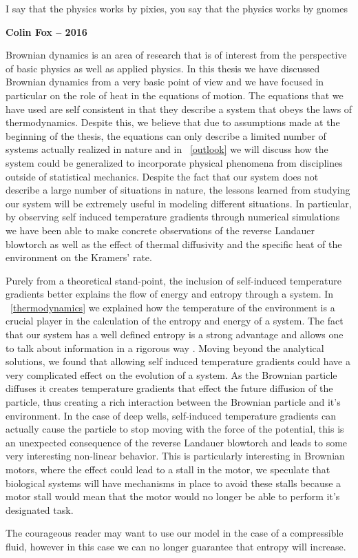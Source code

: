 \epigraph{I say that the physics works by pixies, you say that the physics works by gnomes}{\textbf{Colin Fox -- 2016}}

Brownian dynamics is an area of research that is of interest from the perspective of basic physics as well as applied physics. In this thesis we have discussed Brownian dynamics from a very basic point of view and we have focused in particular on the role of heat in the equations of motion. The equations that we have used are self consistent in that they describe a system that obeys the laws of thermodynamics. Despite this, we believe that due to assumptions made at the beginning of the thesis, the equations can only describe a limited number of systems actually realized in nature and in ~\autoref{outlook} we will discuss how the system could be generalized to incorporate physical phenomena from disciplines outside of statistical mechanics. Despite the fact that our system does not describe a large number of situations in nature, the lessons learned from studying our system will be extremely useful in modeling different situations. In particular, by observing self induced temperature gradients through numerical simulations we have been able to make concrete observations of the reverse Landauer blowtorch as well as the effect of thermal diffusivity and the specific heat of the environment on the Kramers' rate.  

Purely from a theoretical stand-point, the inclusion of self-induced temperature gradients better explains the flow of energy and entropy through a system. In ~\autoref{thermodynamics} we explained how the temperature of the environment is a crucial player in the calculation of the entropy and energy of a system. The fact that our system has a well defined entropy is a strong advantage and allows one to talk about information in a rigorous way \cite{Landauer1961,MyersCelebranoKrishnan2015}. Moving beyond the analytical solutions, we found that allowing self induced temperature gradients could have a very complicated effect on the evolution of a system. As the Brownian particle diffuses it creates temperature gradients that effect the future diffusion of the particle, thus creating a rich interaction between the Brownian particle and it's environment. In the case of deep wells, self-induced temperature gradients can actually cause the particle to stop moving with the force of the potential, this is an unexpected consequence of the reverse Landauer blowtorch and leads to some very interesting non-linear behavior. This is particularly interesting in Brownian motors, where the effect could lead to a stall in the motor, we speculate that biological systems will have mechanisms in place to avoid these stalls because a motor stall would mean that the motor would no longer be able to perform it's designated task.

 The courageous reader may want to use our model in the case of a compressible fluid, however in this case we can no longer guarantee that entropy will increase.